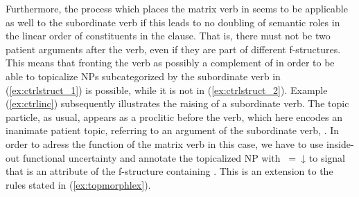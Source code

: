 Furthermore, the process which places the matrix verb in  seems to be
applicable as well to the subordinate verb if this leads to no doubling of
semantic roles in the linear order of constituents in the clause. That is,
there must not be two patient arguments after the verb, even if they are part
of different f-structures. This means that fronting the verb as possibly a
complement of  in order to be able to topicalize NPs subcategorized by
the subordinate verb in (\ref{ex:ctrlstruct_1}) is possible, while it is not in
(\ref{ex:ctrlstruct_2}). Example (\ref{ex:ctrlinc}) subsequently illustrates
the raising of a subordinate verb. The topic particle, as usual, appears as a
proclitic before the verb, which here encodes an inanimate patient topic,
referring to an argument of the subordinate verb, .
In order to adress the \Top{} function of the matrix verb in this case, we have
to use inside-out functional uncertainty and annotate the topicalized NP with
\uncertain{\XCompl}{\Top}~=~↓ to signal that \Top{} is an attribute of the
f-structure containing \XCompl{}. This is an extension to the rules stated in
(\ref{ex:topmorphlex}).

